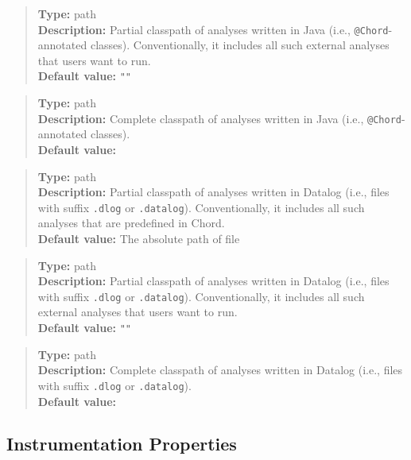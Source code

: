 \begin{quote}
{\bf Type:} path \\
{\bf Description:} Partial classpath of analyses written in Java (i.e., {\tt @Chord}-annotated classes).
Conventionally, it includes all such external analyses that users want to run. \\
{\bf Default value:} {\tt ""}
\end{quote}

\begin{quote}
{\bf Type:} path \\
{\bf Description:} Complete classpath of analyses written in Java (i.e., {\tt @Chord}-annotated classes). \\
{\bf Default value:} 
\end{quote}

\begin{quote}
{\bf Type:} path \\
{\bf Description:} Partial classpath of analyses written in Datalog (i.e., files with suffix {\tt .dlog} or {\tt .datalog}).
Conventionally, it includes all such analyses that are predefined in Chord.  \\
{\bf Default value:} The absolute path of file 
\end{quote}

\begin{quote}
{\bf Type:} path \\
{\bf Description:} Partial classpath of analyses written in Datalog (i.e., files with suffix {\tt .dlog} or {\tt .datalog}).
Conventionally, it includes all such external analyses that users want to run. \\
{\bf Default value:} {\tt ""}
\end{quote}

\begin{quote}
{\bf Type:} path  \\
{\bf Description:} Complete classpath of analyses written in Datalog (i.e., files with suffix {\tt .dlog} or {\tt .datalog}). \\
{\bf Default value:} 
\end{quote}

\subsection{Instrumentation Properties}
\label{sec:instr-props}

